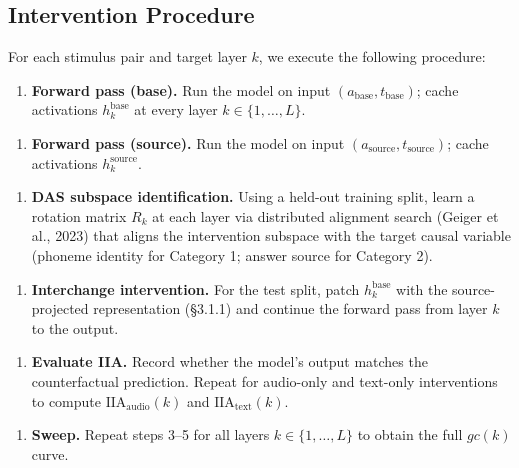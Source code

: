 \documentclass[a4paper]{article}
\begin{document}
\subsection{Intervention Procedure}

For each stimulus pair and target layer $k$, we execute the following procedure:

\begin{enumerate}
\item \textbf{Forward pass (base).} Run the model on input $(a_{\text{base}}, t_{\text{base}})$; cache activations $h_k^{\text{base}}$ at every layer $k \in \{1, \ldots, L\}$.
\end{enumerate}

\begin{enumerate}
\item \textbf{Forward pass (source).} Run the model on input $(a_{\text{source}}, t_{\text{source}})$; cache activations $h_k^{\text{source}}$.
\end{enumerate}

\begin{enumerate}
\item \textbf{DAS subspace identification.} Using a held-out training split, learn a rotation matrix $R_k$ at each layer via distributed alignment search (Geiger et al., 2023) that aligns the intervention subspace with the target causal variable (phoneme identity for Category 1; answer source for Category 2).
\end{enumerate}

\begin{enumerate}
\item \textbf{Interchange intervention.} For the test split, patch $h_k^{\text{base}}$ with the source-projected representation (§3.1.1) and continue the forward pass from layer $k$ to the output.
\end{enumerate}

\begin{enumerate}
\item \textbf{Evaluate IIA.} Record whether the model's output matches the counterfactual prediction. Repeat for audio-only and text-only interventions to compute $\text{IIA}_{\text{audio}}(k)$ and $\text{IIA}_{\text{text}}(k)$.
\end{enumerate}

\begin{enumerate}
\item \textbf{Sweep.} Repeat steps 3–5 for all layers $k \in \{1, \ldots, L\}$ to obtain the full $gc(k)$ curve.
\end{enumerate}
\end{document}
